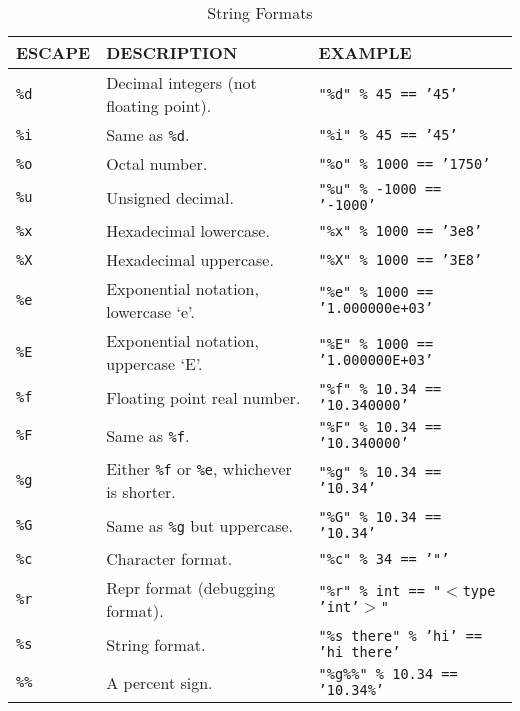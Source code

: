     \begin{table}[htbp]
      \begin{minipage}{\linewidth}
      \setlength{\tymax}{0.5\linewidth}
      \centering
      \small
    \caption{String Formats}
    \label{stringformats}
      \begin{tabulary}{\textwidth}{@{}LLL@{}} \toprule
    ESCAPE&DESCRIPTION&EXAMPLE\\
      \midrule
    \texttt{\%d}&Decimal integers (not floating point).&\texttt{"\%d" \% 45 == '45'}\\
    \texttt{\%i}&Same as \texttt{\%d}.&\texttt{"\%i" \% 45 == '45'}\\
    \texttt{\%o}&Octal number.&\texttt{"\%o" \% 1000 == '1750'}\\
    \texttt{\%u}&Unsigned decimal.&\texttt{"\%u" \% -1000 == '-1000'}\\
    \texttt{\%x}&Hexadecimal lowercase.&\texttt{"\%x" \% 1000 == '3e8'}\\
    \texttt{\%X}&Hexadecimal uppercase.&\texttt{"\%X" \% 1000 == '3E8'}\\
    \texttt{\%e}&Exponential notation, lowercase `e'.&\texttt{"\%e" \% 1000 == '1.000000e+03'}\\
    \texttt{\%E}&Exponential notation, uppercase `E'.&\texttt{"\%E" \% 1000 == '1.000000E+03'}\\
    \texttt{\%f}&Floating point real number.&\texttt{"\%f" \% 10.34 == '10.340000'}\\
    \texttt{\%F}&Same as \texttt{\%f}.&\texttt{"\%F" \% 10.34 == '10.340000'}\\
    \texttt{\%g}&Either \texttt{\%f} or \texttt{\%e}, whichever is shorter.&\texttt{"\%g" \% 10.34 == '10.34'}\\
    \texttt{\%G}&Same as \texttt{\%g} but uppercase.&\texttt{"\%G" \% 10.34 == '10.34'}\\
    \texttt{\%c}&Character format.&\texttt{"\%c" \% 34 == '"'}\\
    \texttt{\%r}&Repr format (debugging format).&\texttt{"\%r" \% int == "$<$type 'int'$>$"}\\
    \texttt{\%s}&String format.&\texttt{"\%s there" \% 'hi' == 'hi there'}\\
    \texttt{\%\%}&A percent sign.&\texttt{"\%g\%\%" \% 10.34 == '10.34\%'}\\
    
    \bottomrule

  \end{tabulary}
      \end{minipage}
      \end{table}


